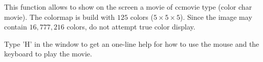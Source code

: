 This function allows to show on the screen a movie of ccmovie type
(color char movie).
The colormap is build with $125$ colors ($5 \times 5 \times 5$).
Since the image may contain $16,777,216$ colors, do not attempt
true color display.

Type 'H' in the window to get an one-line help for how to use the mouse and
the keyboard to play the movie.


